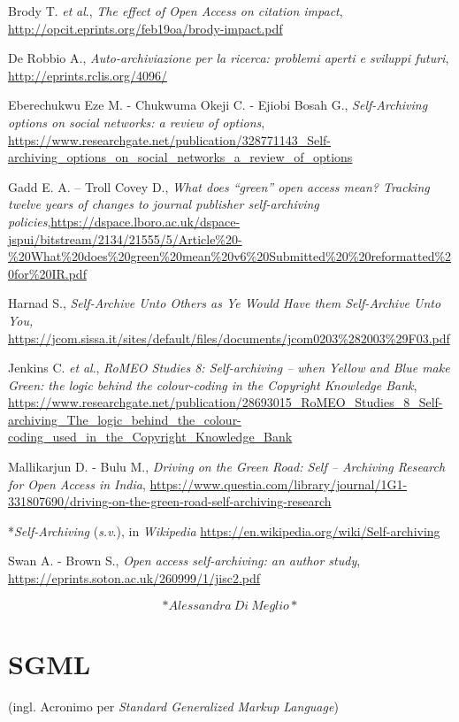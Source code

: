\documentclass[
  b5paper,
  twoside,
  12pt,
  chapterprefix=false,
  bibliography=totocnumbered,
  parskip=false]{scrbook}
\begin{document}
Brody T. \emph{et} \emph{al}., \emph{The effect of Open Access on citation impact},
\url{http://opcit.eprints.org/feb19oa/brody-impact.pdf}

De Robbio A., \emph{Auto-archiviazione per la ricerca: problemi aperti e
sviluppi futuri},
\url{http://eprints.rclis.org/4096/}

Eberechukwu Eze M. - Chukwuma Okeji C. - Ejiobi Bosah G.,
\emph{Self-Archiving options on social networks: a review of options},
\url{https://www.researchgate.net/publication/328771143_Self-archiving_options_on_social_networks_a_review_of_options}

Gadd E. A. -- Troll Covey D., \emph{What does \enquote{green} open access mean?
Tracking twelve years of changes to journal publisher self-archiving
policies},\url{https://dspace.lboro.ac.uk/dspace-jspui/bitstream/2134/21555/5/Article\%20-\%20What\%20does\%20green\%20mean\%20v6\%20Submitted\%20\%20reformatted\%20for\%20IR.pdf}

Harnad S., \emph{Self-Archive Unto Others as Ye Would Have them Self-Archive
Unto You,}
\url{https://jcom.sissa.it/sites/default/files/documents/jcom0203\%282003\%29F03.pdf}

Jenkins C. \emph{et} \emph{al}., \emph{RoMEO Studies 8: Self-archiving -- when Yellow
and Blue make Green: the logic behind the colour-coding in the Copyright
Knowledge Bank},
\url{https://www.researchgate.net/publication/28693015_RoMEO_Studies_8_Self-archiving_The_logic_behind_the_colour-coding_used_in_the_Copyright_Knowledge_Bank}

Mallikarjun D. - Bulu M., \emph{Driving on the Green Road: Self -- Archiving
Research for Open Access in India},
\url{https://www.questia.com/library/journal/1G1-331807690/driving-on-the-green-road-self-archiving-research}

*\emph{Self-Archiving} (\emph{s.v}.), in \emph{Wikipedia}
\url{https://en.wikipedia.org/wiki/Self-archiving}

Swan A. - Brown S., \emph{Open access self-archiving: an author study},
\url{https://eprints.soton.ac.uk/260999/1/jisc2.pdf}

\[*Alessandra~Di~Meglio*\]

\hypertarget{sgml}{%
\chapter{SGML}\label{sgml}}

(ingl. Acronimo per \emph{Standard Generalized Markup Language})
\end{document}
